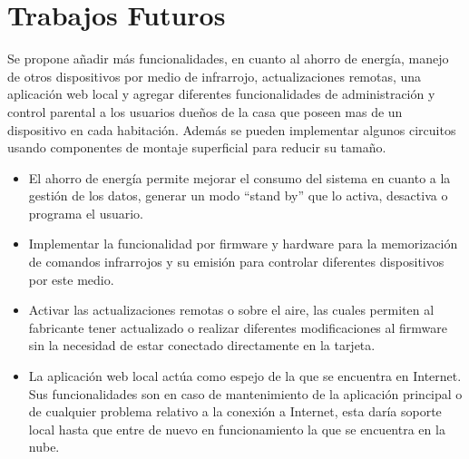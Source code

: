 \chapter{Trabajos Futuros}

Se propone añadir más funcionalidades, en cuanto al ahorro de energía, manejo de otros dispositivos por medio de infrarrojo, actualizaciones remotas, una aplicación web local y agregar diferentes funcionalidades de administración y control parental a los usuarios dueños de la casa que poseen mas de un dispositivo en cada habitación. Además se pueden implementar algunos circuitos usando componentes de montaje superficial para reducir su tamaño.

\begin{itemize}
	\item El ahorro de energía permite mejorar el consumo del sistema en cuanto a la gestión de los datos, generar un modo ``stand by'' que lo activa, desactiva o programa el usuario.
	\item Implementar la funcionalidad por firmware y hardware para la memorización de comandos infrarrojos y su emisión para controlar diferentes dispositivos por este medio.
	\item Activar las actualizaciones remotas o sobre el aire, las cuales permiten al fabricante tener actualizado o realizar diferentes modificaciones al firmware sin la necesidad de estar conectado directamente en la tarjeta.
	\item La aplicación web local actúa como espejo de la que se encuentra en Internet. Sus funcionalidades son en caso de mantenimiento de la aplicación principal o de cualquier problema relativo a la conexión a Internet, esta daría soporte local hasta que entre de nuevo en funcionamiento la que se encuentra en la nube.
\end{itemize}